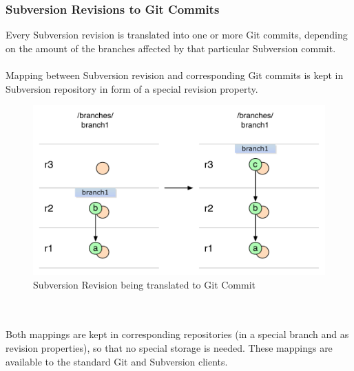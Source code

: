 \subsubsection{Subversion Revisions to Git Commits}

Every Subversion revision is translated into one or more Git commits, depending on the amount of the branches affected by that particular Subversion commit.\\\\%
Mapping between Subversion revision and corresponding Git commits is kept in Subversion repository in form of a special revision property.
\begin{figure}[!h]
\centering
\includegraphics[width=\linewidth]{img/diagrams/single_change_svn_to_git.pdf}
\caption{Subversion Revision being translated to Git Commit}
\label{simple_svn_to_git}
\end{figure}
\\\\
Both mappings are kept in corresponding repositories (in a special branch and as revision properties), so that no special storage is needed. 
These mappings are available to the standard Git and Subversion clients.